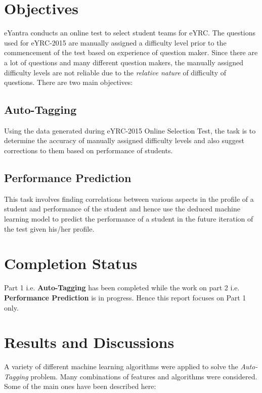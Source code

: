 \documentclass[12pt]{article}
\begin{document}
	
	\newpage
	
	
	\section{Objectives}
	eYantra conducts an online test to select student teams for eYRC. 
	The questions used for eYRC-2015 are manually assigned
	a difficulty level prior to the commencement of the test based on
	experience of question maker. Since there are a lot of questions
	and many different question makers, the manually assigned difficulty
	levels are not reliable due to the \textit{relative nature} of
	difficulty of questions.\newline
	There are two main objectives:
	
	\subsection{Auto-Tagging}
	Using the data generated during eYRC-2015 Online Selection Test, the
	task is to determine the accuracy of manually assigned difficulty
	levels and also suggest corrections to them based on performance
	of students. 
	
	\subsection{Performance Prediction}
	This task involves finding correlations between various aspects in the
	profile of a student and performance of the student and hence use the
	deduced machine learning model to predict the performance of a student
	in the future iteration of the test given his/her profile.\newline	
	
	
	\section{Completion Status}
	Part 1 i.e. \textbf{Auto-Tagging} has been completed while the work 
	on part 2 i.e. \textbf{Performance Prediction} is in progress. Hence
	this report focuses on Part 1 only.
	
	
	\section{Results and Discussions}
	A variety of different machine learning algorithms were applied to 
	solve the \textit{Auto-Tagging} problem. Many combinations of features
	and algorithms were considered. Some of the main ones have been described
	here:
	
\end{document}
